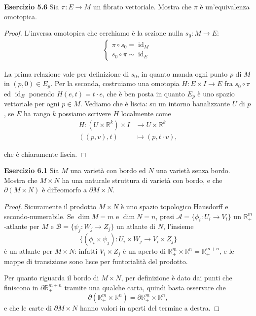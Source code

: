 \documentclass[a4paper]{article}
\newcommand{\R}{\mathbb{R}}
\newcommand{\id}{\operatorname{id}}
\theoremstyle{definition}
\theoremstyle{definition}
\theoremstyle{remark}
\theoremstyle{definition}
\begin{document}
\textbf{Esercizio 5.6}
Sia $\pi: E\to M$ un fibrato vettoriale. Mostra che $\pi$ è un'equivalenza omotopica.

\begin{proof}
L'inversa omotopica che cerchiamo è la sezione nulla $s_0:M\to E$:
\begin{align*}
    \begin{cases}
        \pi\circ s_0 = \id_M \\
        s_0\circ\pi \sim \id_E
    \end{cases}
\end{align*}

La prima relazione vale per definizione di $s_0$, in quanto manda ogni punto $p$ di $M$ in $(p,0)\in E_p$.
Per la seconda, costruiamo una omotopia $H:E\times I\to E$ fra $s_0\circ\pi$ ed $\id_E$ ponendo $H(e,t) = t\cdot e$, che è ben posta in quanto $E_p$ è uno
spazio vettoriale per ogni $p\in M$. Vediamo che è liscia: su un intorno banalizzante $U$ di $p$, se $E$ ha rango $k$ possiamo scrivere $H$ localmente come
\begin{align*}
    H:(U\times \R^k) \times I &\to U\times \R^k \\
    ((p,v),t) &\mapsto (p,t\cdot v),
\end{align*}

che è chiaramente liscia.
\end{proof}

\textbf{Esercizio 6.1}
Sia $M$ una varietà con bordo ed $N$ una varietà senza bordo. Mostra che $M\times N$ ha una naturale struttura di varietà con bordo, e che $\partial(M\times N)$ è diffeomorfo a $\partial M\times N$.

\begin{proof}
    Sicuramente il prodotto $M\times N$ è uno spazio topologico Hausdorff e secondo-numerabile. Se $\operatorname{dim}M = m$ e $\operatorname{dim}N = n$,  presi $\mathcal{A}= \{\phi_i:U_i\to V_i\}$ un $\R^m_+$-atlante per $M$ e $\mathcal{B}=\{\psi_j:W_j\to Z_j\}$ un atlante di $N$, l'insieme
    \[
        \{(\phi_i\times\psi_j):U_i\times W_j\to V_i\times Z_j\}
    \]
    è un atlante per $M\times N$: infatti $V_i\times Z_j$ è un aperto di $\R^m_+\times\R^n = \R^{m+n}_+$, e le mappe di transizione sono lisce per funtorialità del prodotto.

    Per quanto riguarda il bordo di $M\times N$, per definizione è dato dai punti che finiscono in $\partial \R^{m+n}_+$ tramite una qualche carta, quindi basta osservare che
    \[
        \partial (\R^m_+\times\R^n) = \partial \R^m_+\times\R^n,
    \]
    e che le carte di $\partial M \times N$ hanno valori in aperti del termine a destra.

\pagebreak

\end{proof}
\end{document}
